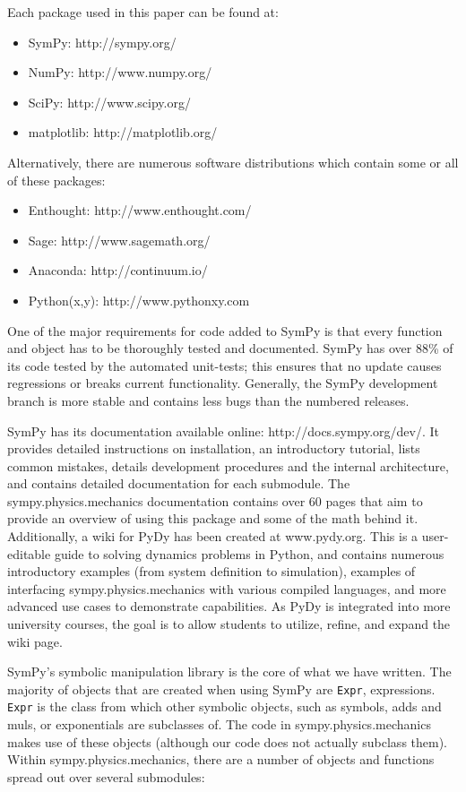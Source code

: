 \documentclass[twocolumn,10pt]{asme2e}
\begin{document}
Each package used in this paper can be found at:
\begin{itemize}
\item SymPy: http://sympy.org/
\item NumPy: http://www.numpy.org/
\item SciPy: http://www.scipy.org/
\item matplotlib: http://matplotlib.org/
\end{itemize}
Alternatively, there are numerous software distributions which contain some or
all of these packages:
\begin{itemize}
\item Enthought: http://www.enthought.com/
\item Sage: http://www.sagemath.org/
\item Anaconda: http://continuum.io/
\item Python(x,y): http://www.pythonxy.com
\end{itemize}

One of the major requirements for code added to SymPy is that every function
and object has to be thoroughly tested and documented.
SymPy has over 88\% of its code tested by the automated unit-tests; this
ensures that no update causes regressions or breaks current functionality.
Generally, the SymPy development branch is more stable and contains less bugs
than the numbered releases.

SymPy has its documentation available online: http://docs.sympy.org/dev/.
It provides detailed instructions on installation, an introductory tutorial,
lists common mistakes, details development procedures and the internal
architecture, and contains detailed documentation for each submodule.
The sympy.physics.mechanics documentation contains over 60 pages that aim to
provide an overview of using this package and some of the math behind it.
Additionally, a wiki for PyDy has been created at www.pydy.org.
This is a user-editable guide to solving dynamics problems in Python, and
contains numerous introductory examples (from system definition to simulation),
examples of interfacing sympy.physics.mechanics with various compiled
languages, and more advanced use cases to demonstrate capabilities.
As PyDy is integrated into more university courses, the goal is to allow
students to utilize, refine, and expand the wiki page.

SymPy's symbolic manipulation library is the core of what we have written.
The majority of objects that are created when using SymPy are \verb|Expr|,
expressions.
\verb|Expr| is the class from which other symbolic objects, such as symbols,
adds and muls, or exponentials are subclasses of.
The code in sympy.physics.mechanics makes use of these objects (although our
code does not actually subclass them).
Within sympy.physics.mechanics, there are a number of objects and functions
spread out over several submodules:
\end{document}
